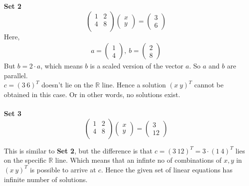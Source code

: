 \documentclass[12pt,letterpaper,fleqn]{article}
\theoremstyle{definition}
\begin{document}
\textbf{Set 2}\\
\begin{equation*}
\begin{pmatrix}
1 &2\\
4 &8\\
\end{pmatrix}
\begin{pmatrix}
x\\
y
\end{pmatrix} =
\begin{pmatrix}
3\\
6
\end{pmatrix}
\end{equation*}
Here,
\begin{equation*}
\begin{split}
a = \begin{pmatrix}
1\\
4
\end{pmatrix},~b = \begin{pmatrix}
2\\
8
\end{pmatrix}
\end{split}
\end{equation*}
But $b = 2\cdot a$, which means $b$ is a scaled version of the vector $a$. So $a$ and $b$ are parallel.\\
$c = (3~6)^{T}$ doesn't lie on the $\mathbb{R}$ line. Hence a solution $(x ~y)^{T}$ cannot be obtained in this case. Or in other words, no solutions exist.\\
\\
\textbf{Set 3}\\
\begin{equation*}
\begin{pmatrix}
1 &2\\
4 &8\\
\end{pmatrix}
\begin{pmatrix}
x\\
y
\end{pmatrix} =
\begin{pmatrix}
3\\
12
\end{pmatrix}
\end{equation*}

This is similar to \textbf{Set 2}, but the difference is that $c = (3~12)^{T} = 3 \cdot (1 ~ 4)^{T}$ lies on the specific $\mathbb{R}$ line. Which means that an infinte no of combinations of $x,y$ in $(x~y)^{T}$ is possible to arrive at $c$.  Hence the given set of linear equations has infinite number of solutions.
\end{document}
